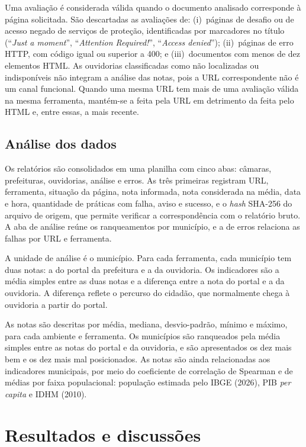 \documentclass[12pt]{article}
\begin{document}
Uma avaliação é considerada válida quando o documento analisado corresponde à página solicitada. São descartadas as avaliações de:
(i)~páginas de desafio ou de acesso negado de serviços de proteção, identificadas por marcadores no título (``\textit{Just a moment}'', ``\textit{Attention Required!}'', ``\textit{Access denied}'');
(ii)~páginas de erro HTTP, com código igual ou superior a 400; e
(iii)~documentos com menos de dez elementos HTML.
As ouvidorias classificadas como não localizadas ou indisponíveis não integram a análise das notas, pois a URL correspondente não é um canal funcional. Quando uma mesma URL tem mais de uma avaliação válida na mesma ferramenta, mantém-se a feita pela URL em detrimento da feita pelo HTML e, entre essas, a mais recente.

\subsection{Análise dos dados}

Os relatórios são consolidados em uma planilha com cinco abas: câmaras, prefeituras, ouvidorias, análise e erros. As três primeiras registram URL, ferramenta, situação da página, nota informada, nota considerada na média, data e hora, quantidade de práticas com falha, aviso e sucesso, e o \textit{hash} SHA-256 do arquivo de origem, que permite verificar a correspondência com o relatório bruto. A aba de análise reúne os ranqueamentos por município, e a de erros relaciona as falhas por URL e ferramenta.

A unidade de análise é o município. Para cada ferramenta, cada município tem duas notas: a do portal da prefeitura e a da ouvidoria. Os indicadores são a média simples entre as duas notas e a diferença entre a nota do portal e a da ouvidoria. A diferença reflete o percurso do cidadão, que normalmente chega à ouvidoria a partir do portal.

As notas são descritas por média, mediana, desvio-padrão, mínimo e máximo, para cada ambiente e ferramenta. Os municípios são ranqueados pela média simples entre as notas do portal e da ouvidoria, e são apresentados os dez mais bem e os dez mais mal posicionados. As notas são ainda relacionadas aos indicadores municipais, por meio do coeficiente de correlação de Spearman e de médias por faixa populacional: população estimada pelo IBGE (2026), PIB \textit{per capita} e IDHM (2010).

\section{Resultados e discussões}
\end{document}
